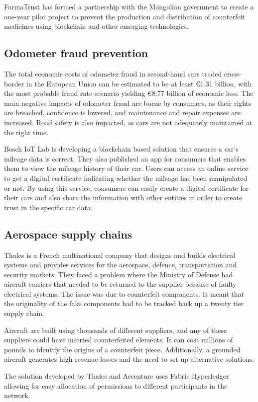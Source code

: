 FarmaTrust has formed a partnership with the Mongolian government to create a one-year pilot project to prevent the production and distribution of counterfeit medicines using blockchain and other emerging technologies. \cite{fake_drugs}

\subsection{Odometer fraud prevention}

The total economic costs of odometer fraud in second-hand cars traded cross-border in the European Union can be estimated to be at least €1.31 billion, with the most probable fraud rate scenario yielding €8.77 billion of economic loss. The main negative impacts of odometer fraud are borne by consumers, as their rights are breached, confidence is lowered, and maintenance and repair expenses are increased. Road safety is also impacted, as cars are not adequately maintained at the right time. \cite{odometer_fraud}

Bosch IoT Lab is developing a blockchain based solution that ensures a car’s mileage data is correct. They also published an app for consumers that enables them to view the mileage history of their car. Users can access an online service to get a digital certificate indicating whether the mileage has been manipulated or not. By using this service, consumers can easily create a digital certificate for their cars and also share the information with other entities in order to create trust in the specific car data. \cite{bosh}

\subsection{Aerospace supply chains}

Thales is a French multinational company that designs and builds electrical systems and provides services for the aerospace, defence, transportation and security markets. They faced a  problem where the Ministry of Defense had aircraft carriers that needed to be returned to the supplier because of faulty electrical systems. The issue was due to counterfeit components. It meant that the originality of the fake components had to be tracked back up a twenty tier supply chain. \cite{thales}

Aircraft are built using thousands of different suppliers, and any of these suppliers could have inserted counterfeited elements. It can cost millions of pounds to identify the origins of a counterfeit piece. Additionally, a grounded aircraft generates high revenue losses and the need to set up alternative solutions. \cite{thales}

The solution developed by Thales and Accenture uses Fabric Hyperledger allowing for easy allocation of permissions to different participants in the network.
